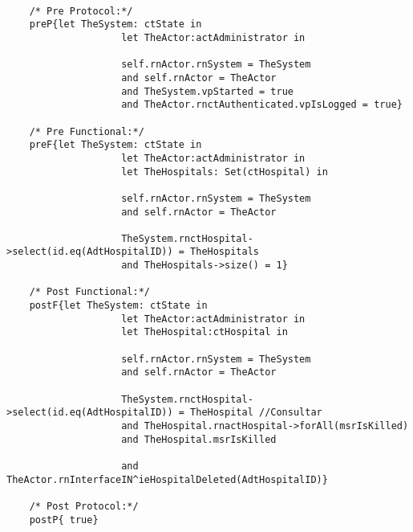 	\scriptsize
	\vspace{0.5cm}
	\begin{lstlisting}[style=MessirStyle,firstnumber=auto,captionpos=b,caption={\msrmessir (MCL-oriented) specification of the operation \emph{oeDeleteHospital}.},label=OM-actAdministrator-oeDeleteHospital-MCL-LST]

	/* Pre Protocol:*/ 
	preP{let TheSystem: ctState in
	 				let TheActor:actAdministrator in
	  
	  				self.rnActor.rnSystem = TheSystem
	  				and self.rnActor = TheActor
	  				and TheSystem.vpStarted = true
	  				and TheActor.rnctAuthenticated.vpIsLogged = true}
	
	/* Pre Functional:*/
	preF{let TheSystem: ctState in
	 				let TheActor:actAdministrator in
	 				let TheHospitals: Set(ctHospital) in
	  
	  				self.rnActor.rnSystem = TheSystem
	  				and self.rnActor = TheActor
	  				
	  				TheSystem.rnctHospital->select(id.eq(AdtHospitalID)) = TheHospitals
	  				and TheHospitals->size() = 1}
	
	/* Post Functional:*/ 
	postF{let TheSystem: ctState in
	 				let TheActor:actAdministrator in
	 				let TheHospital:ctHospital in
	  
	  				self.rnActor.rnSystem = TheSystem
	  				and self.rnActor = TheActor
	  				
	  				TheSystem.rnctHospital->select(id.eq(AdtHospitalID)) = TheHospital //Consultar
	  				and TheHospital.rnactHospital->forAll(msrIsKilled)
	  				and TheHospital.msrIsKilled
	  				
	  				and TheActor.rnInterfaceIN^ieHospitalDeleted(AdtHospitalID)}
	
	/* Post Protocol:*/ 
	postP{ true}
	
	\end{lstlisting}
	\normalsize 
	
	
	
	





